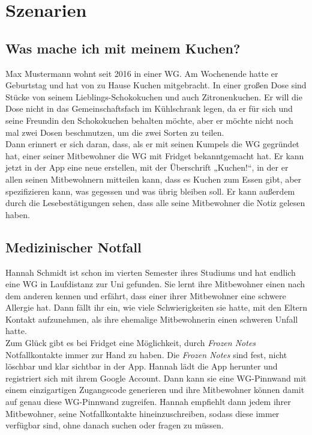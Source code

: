 \documentclass[a4paper]{scrreprt}
\begin{document}
        \section{Szenarien}
        
        
        \subsection{Was mache ich mit meinem Kuchen?}
        Max Mustermann wohnt seit 2016 in einer WG. Am Wochenende hatte er Geburtstag und hat von zu Hause Kuchen mitgebracht. In einer großen Dose sind Stücke von seinem Lieblings-Schokokuchen und auch Zitronenkuchen. Er will die Dose nicht in das Gemeinschaftsfach im Kühlschrank legen, da er für sich und seine Freundin den Schokokuchen behalten möchte, aber er möchte nicht noch mal zwei Dosen beschmutzen, um die zwei Sorten zu teilen.\\
        Dann erinnert er sich daran, dass, als er mit seinen Kumpels die WG gegründet hat, einer seiner Mitbewohner die WG mit Fridget bekanntgemacht hat. Er kann jetzt in der App eine neue  erstellen, mit der Überschrift „Kuchen!“, in der er allen seinen Mitbewohnern mitteilen kann, dass es Kuchen zum Essen gibt, aber spezifizieren kann, was gegessen und was übrig bleiben soll. Er kann außerdem durch die Lesebestätigungen sehen, dass alle seine Mitbewohner die Notiz gelesen haben.
        \\
        
        \subsection{Medizinischer Notfall}
        Hannah Schmidt ist schon im vierten Semester ihres Studiums und hat endlich eine WG in Laufdistanz zur Uni gefunden. Sie lernt ihre Mitbewohner einen nach dem anderen kennen und erfährt, dass einer ihrer Mitbewohner eine schwere Allergie hat. Dann fällt ihr ein, wie viele Schwierigkeiten sie hatte, mit den Eltern Kontakt aufzunehmen, als ihre ehemalige Mitbewohnerin einen schweren Unfall hatte.\\
        Zum Glück gibt es bei Fridget eine Möglichkeit, durch \textit{Frozen Notes} Notfallkontakte immer zur Hand zu haben. Die \textit{Frozen Notes} sind fest, nicht löschbar und klar sichtbar in der App. Hannah lädt die App herunter und registriert sich mit ihrem Google Account. Dann kann sie eine WG-Pinnwand mit einem einzigartigen Zugangscode generieren und ihre Mitbewohner können damit auf genau diese WG-Pinnwand zugreifen. Hannah empfiehlt dann jedem ihrer Mitbewohner, seine Notfallkontakte hineinzuschreiben, sodass diese immer verfügbar sind, ohne danach suchen oder fragen zu müssen.
        \newpage
        
\end{document}
